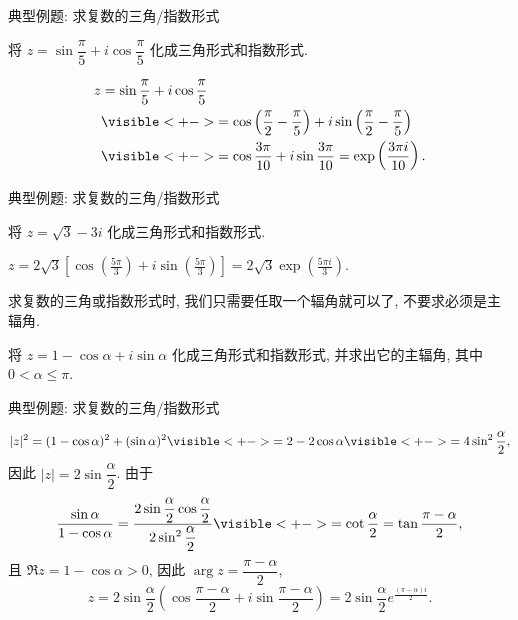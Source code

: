 \begin{frame}{典型例题: 求复数的三角/指数形式}
\begin{example}
将 $z=\sin\dfrac\pi5+i\cos\dfrac\pi5$ 化成三角形式和指数形式.
\end{example}
\begin{solution}
\vspace{-\baselineskip}
\begin{align*}
z&=\sin\frac\pi5+i\cos\frac\pi5\\
&\visible<+->{=\cos\left(\frac\pi2-\frac\pi5\right)+i\sin\left(\frac\pi2-\frac\pi5\right)}\\
&\visible<+->{=\cos\frac{3\pi}{10}+i\sin\frac{3\pi}{10}=\exp\left(\frac{3\pi i}{10}\right).}
\end{align*}
\end{solution}
\end{frame}


\begin{frame}{典型例题: 求复数的三角/指数形式}
\begin{exercise}
将 $z=\sqrt 3-3i$ 化成三角形式和指数形式.
\end{exercise}
\begin{answer}
$\displaystyle z=2\sqrt3\left[\cos\left(\frac{5\pi}3\right)+i\sin\left(\frac{5\pi}3\right)\right]
=2\sqrt3\exp\left(\frac{5\pi i}3\right)$.
\end{answer}
\onslide<+->
求复数的三角或指数形式时, 我们只需要任取一个辐角就可以了, 不要求必须是主辐角.
\begin{example}
将 $z=1-\cos\alpha+i\sin \alpha$ 化成三角形式和指数形式, 并求出它的主辐角, 其中 $0<\alpha\le \pi$.
\end{example}
\end{frame}


\begin{frame}{典型例题: 求复数的三角/指数形式}
\beqskip{8pt}
\begin{solution}
\[|z|^2=(1-\cos\alpha)^2+(\sin\alpha)^2
\visible<+->{=2-2\cos\alpha}
\visible<+->{=4\sin^2\frac\alpha2,}\]
\onslide<+->
因此 $|z|=2\sin\dfrac\alpha2$.
\onslide<+->
由于
\[\frac{\sin\alpha}{1-\cos \alpha}
=\frac{2\sin\dfrac\alpha2\cos\dfrac\alpha2}
{2\sin^2\dfrac\alpha2}
\visible<+->{=\cot\frac\alpha2=\tan\frac{\pi-\alpha}2,}\]
\onslide<+->
且 $\Re z=1-\cos\alpha>0$,
\onslide<+->
因此 $\arg z=\dfrac{\pi-\alpha}2$,
\onslide<+->
\[z=2\sin\frac\alpha2\left(\cos\frac{\pi-\alpha}2+i\sin\frac{\pi-\alpha}2\right)
=2\sin\frac\alpha2 e^{\frac{(\pi-\alpha)i}2}.\]
\end{solution}
\endgroup
\end{frame}


